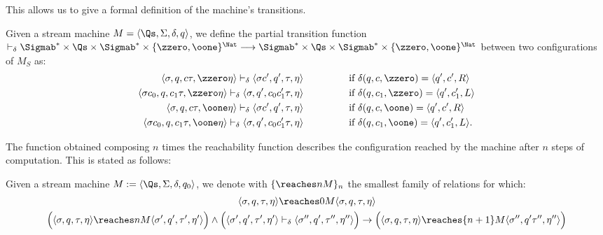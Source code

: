 \begin{conditional}{\notappendix}
    This allows us to give a formal definition of the machine's transitions.

    \begin{defn}
      \label{def:smtransfun}
    Given a stream machine $M=\langle \Qs,
    \Sigma, \delta, q\rangle$,
    we define the partial transition function
    $\vdash_{\delta} \Sigmab^* \times \Qs
    \times \Sigmab^* \times \{\zzero,
    \oone\}^{\Nat} \longrightarrow \Sigmab^*
    \times \Qs \times \Sigmab^* \times \{\zzero,
    \oone\}^{\Nat}$
    between two configurations of $M_S$ as:
    \begin{align*}
    \langle \sigma, q, c\tau, \zzero \eta\rangle
    \vdash_{\delta} \langle\sigma c', q', \tau, \eta\rangle
    \ \ \ \ \ \ \ \ \ \ \ \ \ &\text{ if }
    \delta (q,c,\zzero)
    = \langle q',c',R\rangle
    \\
    \langle \sigma c_0, q, c_1\tau, \zzero
    \eta\rangle
    \vdash_{\delta} \langle \sigma, q', c_0c_1'\tau,
    \eta\rangle
     \ \ \ \ \ \ \ \ \ \ \ \ \ &\text{ if }
    \delta (q, c_1,\zzero)
    = \langle q', c_1', L\rangle  \\
    \langle \sigma, q, c\tau, \oone \eta\rangle
    \vdash_{\delta}
    \langle \sigma c', q', \tau, \eta\rangle
     \ \ \ \ \ \ \ \ \ \ \ \ \ &\text{ if }
     \delta(q, c, \oone)=
     \langle q', c', R\rangle \\
     \langle \sigma c_0, q, c_1\tau,
     \oone\eta\rangle
     \vdash_{\delta} \langle \sigma,
     q', c_0c_1' \tau, \eta \rangle
      \ \ \ \ \ \ \ \ \ \ \ \ \ &\text{ if }
     \delta(q, c_1,\oone)
     = \langle q',c_1', L\rangle.
    \end{align*}
    \end{defn}

    The function obtained composing $n$ times the reachability
    function describes the configuration reached by the machine after $n$
    steps of computation. This is stated as follows:



    \begin{defn}
      \label{def:smreachfuns}
    Given a stream machine $M:=\langle \Qs,
    \Sigma, \delta, q_0\rangle$,
    we denote with $\{\reaches n {M}\}_n$
    the smallest family of relations
    for which:
    \begin{align*}
    \langle \sigma, q, \tau, \eta \rangle
    &\reaches 0 M
    \langle \sigma, q, \tau, \eta\rangle \\
    \Big (
    \langle \sigma, q, \tau, \eta\rangle
    \reaches n M \langle \sigma',
    q', \tau',\eta'\rangle
    \Big )
    \wedge
    \Big (
    \langle \sigma', q',
    \tau', \eta'\rangle
    &\vdash_{\delta}
    \langle \sigma'', q', \tau'',
    \eta'' \rangle
    \Big )
    \rightarrow
    \Big (
    \langle \sigma,q,\tau, \eta\rangle
    \reaches {n+1} M\langle
    \sigma'', q'\tau'',\eta''\rangle
    \Big )
    \end{align*}
    \end{defn}


\end{conditional}
